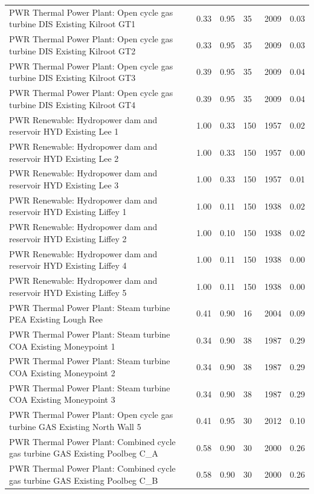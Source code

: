 \documentclass[gmd,manuscript]{copernicus}
\begin{document}
\begin{center}
\begin{longtable}{p{22em}lllll}
PWR Thermal Power Plant: Open cycle gas turbine DIS Existing Kilroot GT1 & 0.33 & 0.95 & 35 & 2009 & 0.03 \\
PWR Thermal Power Plant: Open cycle gas turbine DIS Existing Kilroot GT2 & 0.33 & 0.95 & 35 & 2009 & 0.03 \\
PWR Thermal Power Plant: Open cycle gas turbine DIS Existing Kilroot GT3 & 0.39 & 0.95 & 35 & 2009 & 0.04 \\
PWR Thermal Power Plant: Open cycle gas turbine DIS Existing Kilroot GT4 & 0.39 & 0.95 & 35 & 2009 & 0.04 \\
PWR Renewable: Hydropower dam and reservoir HYD Existing Lee 1 & 1.00 & 0.33 & 150 & 1957 & 0.02 \\
PWR Renewable: Hydropower dam and reservoir HYD Existing Lee 2 & 1.00 & 0.33 & 150 & 1957 & 0.00 \\
PWR Renewable: Hydropower dam and reservoir HYD Existing Lee 3 & 1.00 & 0.33 & 150 & 1957 & 0.01 \\
PWR Renewable: Hydropower dam and reservoir HYD Existing Liffey 1 & 1.00 & 0.11 & 150 & 1938 & 0.02 \\
PWR Renewable: Hydropower dam and reservoir HYD Existing Liffey 2 & 1.00 & 0.10 & 150 & 1938 & 0.02 \\
PWR Renewable: Hydropower dam and reservoir HYD Existing Liffey 4 & 1.00 & 0.11 & 150 & 1938 & 0.00 \\
PWR Renewable: Hydropower dam and reservoir HYD Existing Liffey 5 & 1.00 & 0.11 & 150 & 1938 & 0.00 \\
PWR Thermal Power Plant: Steam turbine PEA Existing Lough Ree & 0.41 & 0.90 & 16 & 2004 & 0.09 \\
PWR Thermal Power Plant: Steam turbine COA Existing Moneypoint 1 & 0.34 & 0.90 & 38 & 1987 & 0.29 \\
PWR Thermal Power Plant: Steam turbine COA Existing Moneypoint 2 & 0.34 & 0.90 & 38 & 1987 & 0.29 \\
PWR Thermal Power Plant: Steam turbine COA Existing Moneypoint 3 & 0.34 & 0.90 & 38 & 1987 & 0.29 \\
PWR Thermal Power Plant: Open cycle gas turbine GAS Existing North Wall 5 & 0.41 & 0.95 & 30 & 2012 & 0.10 \\
PWR Thermal Power Plant: Combined cycle gas turbine GAS Existing Poolbeg C\_A & 0.58 & 0.90 & 30 & 2000 & 0.26 \\
PWR Thermal Power Plant: Combined cycle gas turbine GAS Existing Poolbeg C\_B & 0.58 & 0.90 & 30 & 2000 & 0.26 \\

\end{longtable}
\end{center}
\end{document}
